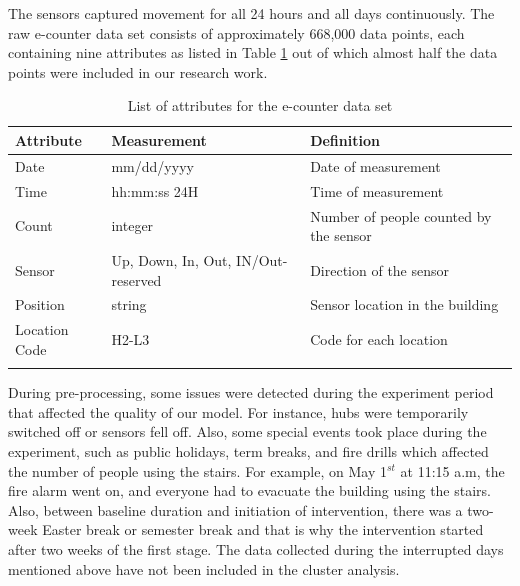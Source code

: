 The sensors captured movement for all 24 hours and all days continuously. The raw e-counter data set consists of approximately 668,000 data points, each containing nine attributes as listed in Table \ref{attr} out of which almost half the data points were included in our research work. 


\begin{table}[!h]{}
\centering
\caption{List of attributes for the e-counter data set}

    \begin{tabular}{p{2cm} p{3.5cm}  p{4.5cm} }
    \hline
    \textbf{Attribute} & \textbf{Measurement} & \textbf{Definition}\\ \hline
    \midrule
Date             &  mm/dd/yyyy      &   Date of measurement                                 \\\hline
Time             &  hh:mm:ss 24H    &   Time of measurement                                 \\\hline
Count            &  integer         &   Number of people counted by the sensor              \\ \hline
Sensor           &  Up, Down, In, Out, IN/Out-reserved & Direction of the sensor             \\ \hline
Position         &    string         &   Sensor location in the building                                                                                                      \\ \hline
Location Code    &     H2-L3             & Code for each location                                                                                                                                       \\ \hline
    \bottomrule
    \label{attr}
\end{tabular}
\end{table}







During pre-processing, some issues were detected during the experiment period that affected the quality of our model. For instance, hubs were temporarily switched off or sensors fell off. Also, some special events took place during the experiment, such as public holidays, term breaks, and fire drills which affected the number of people using the stairs. For example, on May 1$^{st}$ at 11:15 a.m, the fire alarm went on, and everyone had to evacuate the building using the stairs. Also, between baseline duration and initiation of intervention, there was a two-week Easter break or semester break and that is why the intervention started after two weeks of the first stage. The data collected during the interrupted days mentioned above have not been included in the cluster analysis.

